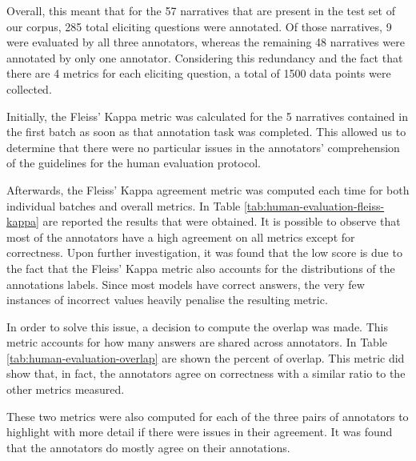 Overall, this meant that for the 57 narratives that are present in the test set of our corpus, 285 total eliciting questions were annotated. Of those narratives, 9 were evaluated by all three annotators, whereas the remaining 48 narratives were annotated by only one annotator. Considering this redundancy and the fact that there are 4 metrics for each eliciting question, a total of 1500 data points were collected.


Initially, the Fleiss' Kappa \cite{fleiss} metric was calculated for the 5 narratives contained in the first batch as soon as that annotation task was completed. This allowed us to determine that there were no particular issues in the annotators' comprehension of the guidelines for the human evaluation protocol.


Afterwards, the Fleiss' Kappa agreement metric was computed each time for both individual batches and overall metrics. In Table \ref{tab:human-evaluation-fleiss-kappa} are reported the results that were obtained. It is possible to observe that most of the annotators have a high agreement on all metrics except for correctness. Upon further investigation, it was found that the low score is due to the fact that the Fleiss' Kappa metric also accounts for the distributions of the annotations labels. Since most models have correct answers, the very few instances of incorrect values heavily penalise the resulting metric.

In order to solve this issue, a decision to compute the overlap was made. This metric accounts for how many answers are shared across annotators. In Table \ref{tab:human-evaluation-overlap} are shown the percent of overlap. This metric did show that, in fact, the annotators agree on correctness with a similar ratio to the other metrics measured. 




These two metrics were also computed for each of the three pairs of annotators to highlight with more detail if there were issues in their agreement. 
% 
% 
It was found that the annotators do mostly agree on their annotations.

